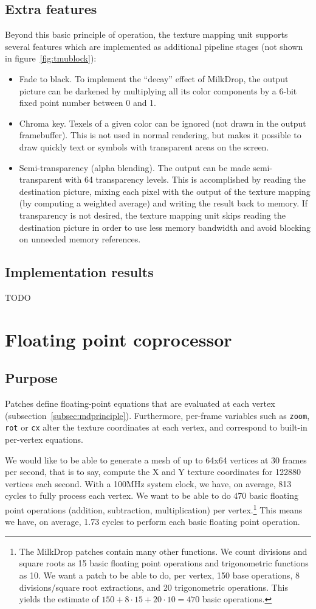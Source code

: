 \documentclass[a4paper,11pt]{kthesis}
\begin{document}
\section{Extra features}
Beyond this basic principle of operation, the texture mapping unit supports several features which are implemented as additional pipeline stages (not shown in figure~\ref{fig:tmublock}):
\begin{itemize}
\item Fade to black. To implement the ``decay'' effect of MilkDrop, the output picture can be darkened by multiplying all its color components by a 6-bit fixed point number between 0 and 1.
\item Chroma key. Texels of a given color can be ignored (not drawn in the output framebuffer). This is not used in normal rendering, but makes it possible to draw quickly text or symbols with transparent areas on the screen.
\item Semi-transparency (alpha blending). The output can be made semi-transparent with 64 transparency levels. This is accomplished by reading the destination picture, mixing each pixel with the output of the texture mapping (by computing a weighted average) and writing the result back to memory. If transparency is not desired, the texture mapping unit skips reading the destination picture in order to use less memory bandwidth and avoid blocking on unneeded memory references.
\end{itemize}

\section{Implementation results}
TODO

\chapter{Floating point coprocessor}
\label{ch:pfpu}
\section{Purpose}
Patches define floating-point equations that are evaluated at each vertex (subsection~\ref{subsec:mdprinciple}). Furthermore, per-frame variables such as \verb!zoom!, \verb!rot! or \verb!cx! alter the texture coordinates at each vertex, and correspond to built-in per-vertex equations.

We would like to be able to generate a mesh of up to 64x64 vertices at 30 frames per second, that is to say, compute the X and Y texture coordinates for 122880 vertices each second. With a 100MHz system clock, we have, on average, 813 cycles to fully process each vertex. We want to be able to do 470 basic floating point operations (addition, subtraction, multiplication) per vertex.\footnote{The MilkDrop patches contain many other functions. We count divisions and square roots as 15 basic floating point operations and trigonometric functions as 10. We want a patch to be able to do, per vertex, 150 base operations, 8 divisions/square root extractions, and 20 trigonometric operations. This yields the estimate of $150+8\cdot15+20\cdot10=470$ basic operations.} This means we have, on average, 1.73 cycles to perform each basic floating point operation.
\end{document}
